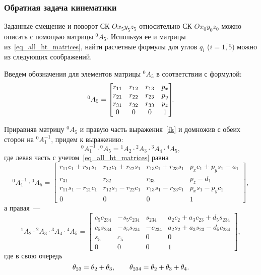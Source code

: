 \subsubsection{Обратная задача кинематики}\label{part_kinematics_inverse}
Заданные смещение и поворот СК $Ox_5y_5z_5$ относительно СК $Ox_0y_0z_0$ можно описать с помощью матрицы ${}^0A_5$.
Используя ее и матрицы из~\eqref{eq_all_ht_matrices}, найти расчетные формулы для углов $q_i$ ($i=\overline{1,5}$) можно из следующих соображений.

Введем обозначения для элементов матрицы ${}^0A_5$ в соответствии с формулой:
\begin{equation}\label{ik}
	{}^0A_5 =
	\left[\begin{matrix}
	r_{11} & r_{12} & r_{13} & p_{x}\\
	r_{21} & r_{22} & r_{23} & p_{y}\\
	r_{31} & r_{32} & r_{33} & p_{z}\\
	0 & 0 & 0 & 1
	\end{matrix}\right]\!\!\ldotp
\end{equation}

Приравняв матрицу ${}^0A_5$ и правую часть выражения~\eqref{fk} и домножив с обеих сторон на ${}^0A_1^{-1}$, придем к выражению:
\begin{equation}
	{}^0A_1^{-1} \cdot {}^0A_5 = {}^1A_2 \cdot {}^2A_3 \cdot {}^3A_4 \cdot {}^4A_5,
\end{equation}
где левая часть с учетом~\eqref{eq_all_ht_matrices} равна
\begin{equation}\label{eq_left_part}
	{}^0A_1^{-1} \cdot {}^0A_5 =
	\left[\begin{matrix}
		r_{11} c_{1} + r_{21} s_{1} & r_{12} c_{1} + r_{22} s_{1} & r_{13} c_{1} + r_{23} s_{1} &  p_{x} c_{1} + p_{y} s_{1} - a_{1}\\
		r_{31} & r_{32} & r_{33} & p_{z} - d_{1}\\
		r_{11} s_{1} - r_{21} c_{1} & r_{12} s_{1} - r_{22} c_{1} & r_{13} s_{1} - r_{23} c_{1} & p_{x} s_{1} - p_{y} c_{1}\\
		0 & 0 & 0 & 1\end{matrix}\right]\!\!,
\end{equation}
а правая~---
\begin{equation}\label{eq_right_part}
	{}^1A_2 \cdot {}^2A_3 \cdot {}^3A_4 \cdot {}^4A_5 =
	\left[\begin{matrix}
		c_{5} c_{234} & - s_{5} c_{234} & s_{234} & a_{2} c_{2} + a_{3} c_{23} + d_{5} s_{234}\\
		c_{5} s_{234} & - s_{5} s_{234} & - c_{234} & a_{2} s_{2} + a_{3} s_{23} - d_{5} c_{234}\\
		s_{5} & c_{5} & 0 & 0\\
		0 & 0 & 0 & 1
	\end{matrix}\right]\!\!,
\end{equation}
где в свою очередь
\begin{equation}\label{eq_theta_23_234}
    \theta_{23} = \theta_2 + \theta_3,
    \qquad
    \theta_{234} = \theta_2 + \theta_3 + \theta_4\ldotp
\end{equation}

